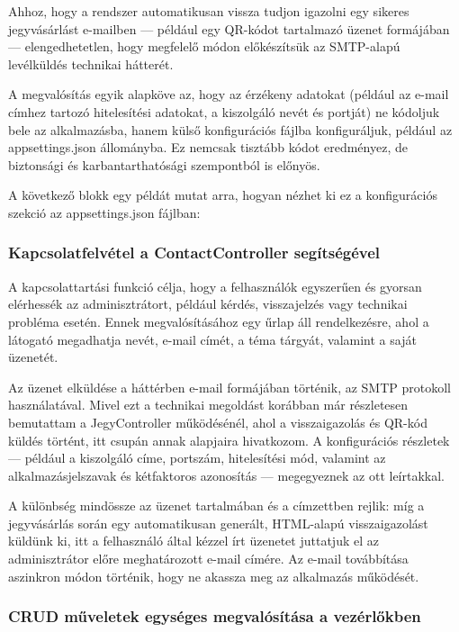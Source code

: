 Ahhoz, hogy a rendszer automatikusan vissza tudjon igazolni egy sikeres jegyvásárlást e-mailben — például egy QR-kódot tartalmazó üzenet formájában — elengedhetetlen, hogy megfelelő módon előkészítsük az SMTP-alapú levélküldés technikai hátterét.

A megvalósítás egyik alapköve az, hogy az érzékeny adatokat (például az e-mail címhez tartozó hitelesítési adatokat, a kiszolgáló nevét és portját) ne kódoljuk bele az alkalmazásba, hanem külső konfigurációs fájlba konfiguráljuk, például az appsettings.json állományba. Ez nemcsak tisztább kódot eredményez, de biztonsági és karbantarthatósági szempontból is előnyös.

A következő blokk egy példát mutat arra, hogyan nézhet ki ez a konfigurációs szekció az appsettings.json fájlban:

\subsubsection{Kapcsolatfelvétel a ContactController segítségével}

A kapcsolattartási funkció célja, hogy a felhasználók egyszerűen és gyorsan elérhessék az adminisztrátort, például kérdés, visszajelzés vagy technikai probléma esetén. Ennek megvalósításához egy űrlap áll rendelkezésre, ahol a látogató megadhatja nevét, e-mail címét, a téma tárgyát, valamint a saját üzenetét.

Az üzenet elküldése a háttérben e-mail formájában történik, az SMTP protokoll használatával. Mivel ezt a technikai megoldást korábban már részletesen bemutattam a JegyController működésénél, ahol a visszaigazolás és QR-kód küldés történt, itt csupán annak alapjaira hivatkozom. A konfigurációs részletek — például a kiszolgáló címe, portszám, hitelesítési mód, valamint az alkalmazásjelszavak és kétfaktoros azonosítás — megegyeznek az ott leírtakkal.

A különbség mindössze az üzenet tartalmában és a címzettben rejlik: míg a jegyvásárlás során egy automatikusan generált, HTML-alapú visszaigazolást küldünk ki, itt a felhasználó által kézzel írt üzenetet juttatjuk el az adminisztrátor előre meghatározott e-mail címére. Az e-mail továbbítása aszinkron módon történik, hogy ne akassza meg az alkalmazás működését.


\subsubsection{CRUD műveletek egységes megvalósítása a vezérlőkben}


